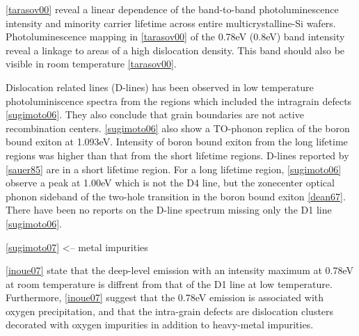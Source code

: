 \ref{tarasov00} reveal a linear dependence of the band-to-band photoluminescence intensity and minority carrier lifetime across entire multicrystalline-Si wafers. Photoluminescence mapping in \ref{tarasov00} of the 0.78eV (0.8eV) band intensity reveal a linkage to areas of a high dislocation density. This band should also be visible in room temperature \ref{tarasov00}.


Dislocation related lines (D-lines) has been observed in low temperature photoluminiscence spectra from the regions which included the intragrain defects \ref{sugimoto06}. They also conclude that grain boundaries are not active recombination centers. \ref{sugimoto06} also show a TO-phonon replica of the boron bound exiton at 1.093eV. Intensity of boron bound exiton from the long lifetime regions was higher than that from the short lifetime regions. D-lines reported by \ref{sauer85} are in a short lifetime region. For a long lifetime region, \ref{sugimoto06} observe a peak at 1.00eV which is not the D4 line, but the zonecenter optical phonon sideband of the two-hole transition in the boron bound exiton \ref{dean67}. There have been no reports on the D-line spectrum missing only the D1 line \ref{sugimoto06}.

\ref{sugimoto07} <-- metal impurities

\ref{inoue07} state that the deep-level emission with an intensity maximum at 0.78eV at room temperature is diffrent from that of the D1 line at low temperature. Furthermore, \ref{inoue07} suggest that the 0.78eV emission is associated with oxygen precipitation, and that the intra-grain defects are dislocation clusters decorated with oxygen impurities in addition to heavy-metal impurities.